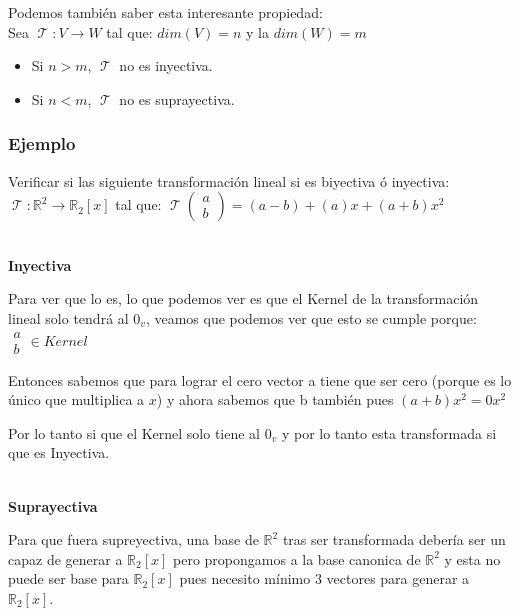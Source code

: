 \documentclass[12pt]{report}                                %
\DeclareMathOperator \LinealTransformation {\mathcal{T}}
\begin{document}
        Podemos también saber esta interesante propiedad:\\
        Sea $\LinealTransformation: V \to W$ tal que: $dim(V) = n$ y la $dim(W)=m$
        \begin{itemize}
            \item Si $n > m$, $\LinealTransformation$ no es inyectiva.
            \item Si $n < m$, $\LinealTransformation$ no es suprayectiva.
        \end{itemize}


            \clearpage
            \subsubsection{Ejemplo}
            Verificar si las siguiente transformación lineal si es biyectiva ó inyectiva:
            $\LinealTransformation : \mathbb{R}^2 \to \mathbb{R}_2[x]$ tal que: 
            $\LinealTransformation(\begin{matrix}a\\b\end{matrix}) = (a-b) + (a)x + (a+b)x^2$

            \textbf{\\Inyectiva}

            Para ver que lo es, lo que podemos ver es que el Kernel de la transformación lineal
            solo tendrá al $0_v$, veamos que podemos ver que esto se cumple porque:
            $\begin{matrix}a\\b\end{matrix} \in Kernel$

            Entonces sabemos que para lograr el cero vector a tiene que ser cero (porque es lo 
            único que multiplica a $x$) y ahora sabemos que b también pues $(a+b)x^2=0x^2$

            Por lo tanto si que el Kernel solo tiene al $0_v$ y por lo tanto esta transformada si que es Inyectiva.


            \textbf{\\Suprayectiva}

            Para que fuera supreyectiva, una base de $\mathbb{R}^2$ tras ser transformada debería ser un capaz de
            generar a $\mathbb{R}_2[x]$ pero propongamos a la base canonica de  $ \mathbb{R}^2$ y esta no puede
            ser base para $\mathbb{R}_2[x]$ pues necesito mínimo 3 vectores para generar a $\mathbb{R}_2[x]$.
\end{document}

